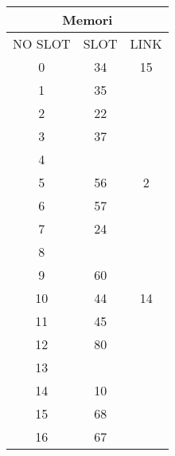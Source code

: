 \documentclass[12pt,a4paper]{article}
\begin{document}
\begin{enumerate}
\begin{multicols}{2}
      \begin{center}
        \begin{adjustbox}{scale=1,center}
          \begin{tabular}{ |c|c|c| } 
            \hline \multicolumn{3}{|c|}{Memori} \\ \hline \hline 
            NO SLOT & SLOT & LINK \\ \hline \hline
            0       & 34   &  15  \\ \hline
            1       & 35   &      \\ \hline
            2       & 22   &      \\ \hline
            3       & 37   &      \\ \hline
            4       &      &      \\ \hline
            5       & 56   &   2  \\ \hline
            6       & 57   &      \\ \hline
            7       & 24   &      \\ \hline
            8       &      &      \\ \hline
            9       & 60   &      \\ \hline
            10      & 44   &  14  \\ \hline
            11      & 45   &      \\ \hline
            12      & 80   &      \\ \hline
            13      &      &      \\ \hline
            14      & 10   &      \\ \hline
            15      & 68   &      \\ \hline
            16      & 67   &      \\ \hline
          \end{tabular}
        \end{adjustbox}
      \end{center}



\end{multicols}
\end{enumerate}
\end{document}
